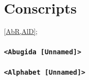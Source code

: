 \newpage
\part{Conscripts}
\cref{AbR,AlD};

\newpage
\section{\texttt{<Abugida~[Unnamed]>}}


\newpage
\section{\texttt{<Alphabet [Unnamed]>}}
